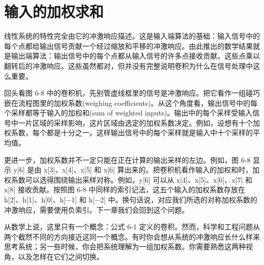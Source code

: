 \section{输入的加权求和}

线性系统的特性完全由它的冲激响应描述。这是输入端算法的基础：输入信号中的每个点都给输出信号贡献一个经过缩放和平移的冲激响应。由此推出的数学结果就是输出端算法：输出信号中的每个点都从输入信号的许多点接收贡献，这些点乘以翻转后的冲激响应。这些虽然都对，但并没有完整说明卷积为什么在信号处理中这么重要。

回头看图 6-8
中的卷积机，先别管虚线框里的信号是冲激响应。把它看作一组碰巧嵌在流程图里的加权系数(weighing
coefficients)。从这个角度看，输出信号中的每个采样都等于输入的加权和(sum
of weighted
inputs)。输出中的每个采样受输入信号中一片区域的采样影响，这片区域由选定的加权系数决定。例如，设想有十个加权系数，每个都是十分之一。这样输出信号中的每个采样就是输入中十个采样的平均值。

更进一步，加权系数并不一定只能在正在计算的输出采样的左边。例如，图 6-8
显示 y{[}6{]} 是由 x{[}3{]}、x{[}4{]}、x{[}5{]} 和 x{[}6{]}
算出来的。把卷积机看作输入的加权和时，加权系数可以选得围绕输出采样对称。例如，y{[}6{]}
可以从 x{[}4{]}、x{[}5{]}、x{[}6{]}、x{[}7{]} 和 x{[}8{]}
接收贡献。按照图 6-8 中同样的索引记法，这五个输入的加权系数存放在
h{[}2{]}、h{[}1{]}、h{[}0{]}、h{[}−1{]} 和 h{[}−2{]}
中。换句话说，对应我们所选的对称加权系数的冲激响应，需要使用负索引。下一章我们会回到这个问题。

从数学上说，这里只有一个概念：公式 6-1
定义的卷积。然而，科学和工程问题从两个截然不同的方向接近这同一个概念。有时你会想从系统的冲激响应长什么样来思考系统；另一些时候，你会把系统理解为一组加权系数。你需要熟悉这两种视角，以及怎样在它们之间切换。
